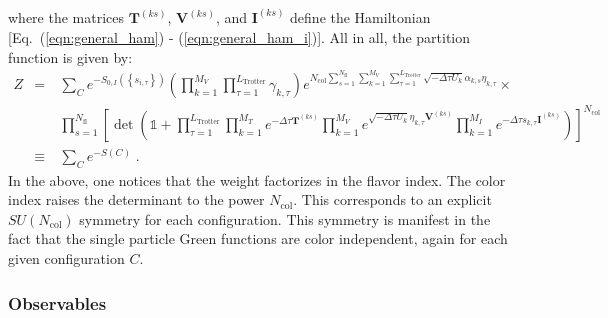 where the matrices $\textbf{T}^{(ks)}$,  $\textbf{V}^{(ks)}$, and  $\textbf{I}^{(ks)}$ define the Hamiltonian [Eq.~(\ref{eqn:general_ham}) - (\ref{eqn:general_ham_i})].
All in all,   the partition function is given by:
\begin{eqnarray}\label{eqn:partition_2}
    Z  &=&   \sum_{C}   e^{-S_{0,I} \left( \left\{ s_{i,\tau} \right\}  \right) }     \left( \prod_{k=1}^{M_V} \prod_{\tau=1}^{L_{\mathrm{Trotter}}} \gamma_{k,\tau} \right)
    e^{ N_{\mathrm{col}}\sum\limits_{s=1}^{N_{\mathrm{fl}}} \sum\limits_{k=1}^{M_V} \sum\limits_{\tau = 1}^{L_{\mathrm{Trotter}}}\sqrt{-\Delta \tau U_k}  \alpha_{k,s} \eta_{k,\tau} } 
  \times   \nonumber \\
  &\quad&
      \prod_{s=1}^{N_{\mathrm{fl}}}\left[\det\left(  \mathds{1} + 
     \prod_{\tau=1}^{L_{\mathrm{Trotter}}}   \prod_{k=1}^{M_T}   e^{-\Delta \tau {\bm T}^{(ks)}}  
    \prod_{k=1}^{M_V}   e^{  \sqrt{ -\Delta \tau  U_k} \eta_{k,\tau} {\bm V}^{(ks)} }   \prod_{k=1}^{M_I}   e^{  -\Delta \tau s_{k,\tau}  {\bm I}^{(ks)}}  
     \right) \right]^{N_{\mathrm{col}}}  \nonumber \\ 
     & \equiv&  \sum_{C} e^{-S(C) }\;.
\end{eqnarray}
In the above, one notices that the weight factorizes in  the flavor index. The color index raises the determinant to the power $N_{\mathrm{col}}$. 
This corresponds to  an explicit $SU(N_{\mathrm{col}})$ symmetry   for each  configuration. This symmetry is manifest in the fact that the single particle  Green functions are color independent, again for each given  configuration $C$.

\subsubsection{Observables}\label{Observables.General}

